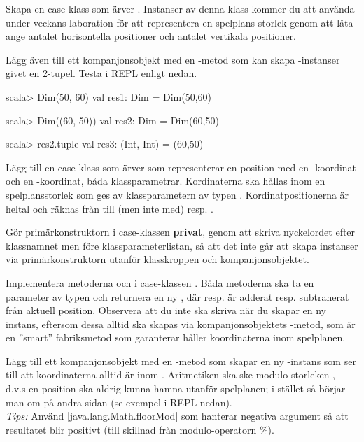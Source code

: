 \Subtask Skapa en case-klass  som ärver . Instanser av denna klass kommer du att använda under veckans laboration för att representera en spelplans storlek genom att låta  ange antalet horisontella positioner och  antalet vertikala positioner.

Lägg även till ett kompanjonsobjekt  med en -metod som kan skapa -instanser givet en 2-tupel.
Testa i REPL enligt nedan.
\begin{REPLnonum}
scala> Dim(50, 60)
val res1: Dim = Dim(50,60)

scala> Dim((60, 50))
val res2: Dim = Dim(60,50)

scala> res2.tuple
val res3: (Int, Int) = (60,50)
\end{REPLnonum}

\Subtask Lägg till en case-klass  som ärver  som representerar en position med en -koordinat och en -koordinat, båda klassparametrar. Kordinaterna ska hållas inom en spelplansstorlek som ges av klassparametern  av typen . Kordinatpositionerna är heltal och räknas från  till (men inte med)  resp. .

Gör primärkonstruktorn i case-klassen  \textbf{privat}, genom att skriva nyckelordet  efter klassnamnet men före klassparameterlistan, så att det inte går att skapa instanser via primärkonstruktorn utanför klasskroppen och kompanjonsobjektet. 

Implementera metoderna \code{+} och \code{-} i case-klassen . Båda metoderna ska ta en parameter  av typen  och returnera en ny , där  resp.  är adderat resp. subtraherat från aktuell position. Observera att du inte ska skriva  när du skapar en ny instans, eftersom dessa alltid ska skapas via kompanjonsobjektets -metod, som är en ''smart'' fabriksmetod som garanterar håller koordinaterna inom spelplanen. 

Lägg till ett kompanjonsobjekt  med en -metod som skapar en ny -instans som ser till att koordinaterna alltid är inom . Aritmetiken ska ske modulo storleken , d.v.s en position ska aldrig kunna hamna utanför spelplanen; i stället så börjar man om på andra sidan (se exempel i REPL nedan). \\ \emph{Tips:} Använd  \code|java.lang.Math.floorMod| som hanterar negativa argument så att resultatet blir positivt (till skillnad från modulo-operatorn \%).

